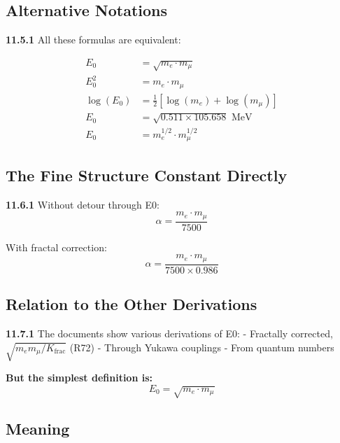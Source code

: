 \subsection{Alternative Notations}

\noindent \textbf{11.5.1} All these formulas are equivalent:

\begin{align}
	E_0 &= \sqrt{m_e \cdot m_\mu} \\
	E_0^2 &= m_e \cdot m_\mu \\
	\log(E_0) &= \frac{1}{2}[\log(m_e) + \log(m_\mu)] \\
	E_0 &= \sqrt{0.511 \times 105.658} \text{ MeV} \\
	E_0 &= m_e^{1/2} \cdot m_\mu^{1/2}
\end{align}

\subsection{The Fine Structure Constant Directly}

\begin{tcolorbox}[colback=green!5!white,colframe=green!75!black,title=\textbf{The Most Direct Formula}]
	\noindent \textbf{11.6.1} Without detour through E0:
	\begin{equation}
		\boxed{\alpha = \frac{m_e \cdot m_\mu}{7500}}
	\end{equation}
	
	With fractal correction:
	\begin{equation}
		\boxed{\alpha = \frac{m_e \cdot m_\mu}{7500 \times 0.986}}
	\end{equation}

\end{tcolorbox}

\subsection{Relation to the Other Derivations}

\noindent \textbf{11.7.1} The documents show various derivations of E0:
- Fractally corrected, $\sqrt{m_e m_\mu/K_{\text{frac}}}$ (R72)
- Through Yukawa couplings
- From quantum numbers

\textbf{But the simplest definition is:}
\begin{equation}
	\boxed{E_0 = \sqrt{m_e \cdot m_\mu}}
\end{equation}

\subsection{Meaning}

